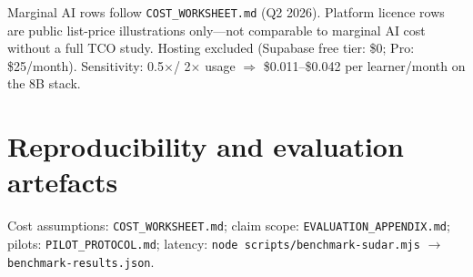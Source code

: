\documentclass[10pt,twocolumn]{article}
\begin{document}
\begin{center}
\scriptsize
{}
\end{center}
\noindent\small{Marginal AI rows follow \texttt{COST\_WORKSHEET.md} (Q2 2026).
Platform licence rows are public list-price illustrations only---not
comparable to marginal AI cost without a full TCO study. Hosting
excluded (Supabase free tier: \$0; Pro: \$25/month). Sensitivity: 0.5$\times$/
2$\times$ usage $\Rightarrow$ \$0.011--\$0.042 per learner/month on the
8B stack.}

\section{Reproducibility and evaluation artefacts}
\noindent\small{Cost assumptions: \texttt{COST\_WORKSHEET.md}; claim scope:
\texttt{EVALUATION\_APPENDIX.md}; pilots: \texttt{PILOT\_PROTOCOL.md};
latency: \texttt{node scripts/benchmark-sudar.mjs} $\rightarrow$
\texttt{benchmark-results.json}.}



\end{document}

